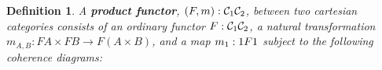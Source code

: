 \documentclass{article}
\let\mto\to
\let\to\relax
\newcommand{\to}{\rightarrow}
\let\t\relax
\newcommand{\cat}[1]{\mathcal{#1}}
\newcommand{\t}[0]{\mathsf{t}}
\newtheorem{definition}[theorem]{Definition}
\begin{document}
\begin{definition}
  \label{def:prod-functor}
  A \textbf{product functor}, $(F,m) : \cat{C}_1 \to \cat{C}_2$,
  between two cartesian categories consists of an ordinary functor $F
  : \cat{C}_1 \to \cat{C}_2$, a natural transformation $m_{A,B} : FA
  \times FB \mto F(A \times B)$, and a map $m_1 : 1 \to F1$ subject to the
  following coherence diagrams:
\end{definition}
\end{document}

